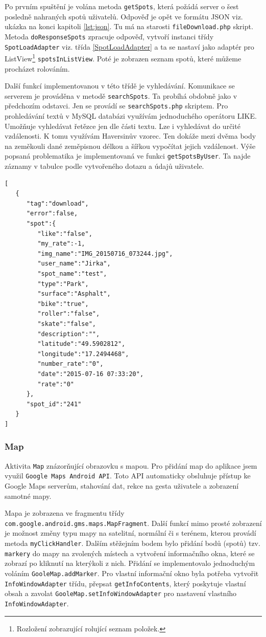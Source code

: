 \documentclass[12pt]{article}
\begin{document}
Po prvním spuštění je volána metoda \verb+getSpots+, která požádá server o šest posledně nahraných spotů uživatelů. Odpověď je opět ve formátu JSON viz. ukázka na konci kapitoli \ref{lst:json}. Tu má na starosti \verb+fileDownload.php+ skript. Metoda \verb+doResponseSpots+ zpracuje odpověď, vytvoří instanci třídy \verb+SpotLoadAdapter+ viz. třída \ref{SpotLoadAdapter} a ta se nastaví jako adaptér pro ListView\footnote[11]{Rozložení zobrazující rolující seznam položek.} \verb+spotsInListView+. Poté je zobrazen seznam spotů, které můžeme procházet rolováním.

Další funkcí implementovanou v této třídě je vyhledávání. Komunikace se serverem je prováděna v metodě \verb+searchSpots+. Ta probíhá obdobně jako v předchozím odstavci. Jen se provádí se \verb+searchSpots.php+ skriptem. Pro prohledávání textů v MySQL databázi využívám jednoduchého operátoru LIKE. Umožňuje vyhledávat řetězce jen dle části textu. Lze i vyhledávat do určité vzdálenosti. K tomu využívám Haversinův vzorec. Ten dokáže mezi dvěma body na zeměkouli dané zeměpisnou délkou a šířkou vypočítat jejich vzdálenost.\cite{haversine} Výše popsaná problematika je implementovaná ve funkci \verb+getSpotsByUser+. Ta najde záznamy v tabulce podle vytvořeného dotazu a údajů uživatele.
\newpage
\begin{lstlisting}[title=Ukázka odpovědi PHP skriptu fileDownload.php,
label={lst:json}]
[
   {
      "tag":"download",
      "error":false,
      "spot":{
         "like":"false",
         "my_rate":-1,
         "img_name":"IMG_20150716_073244.jpg",
         "user_name":"Jirka",
         "spot_name":"test",
         "type":"Park",
         "surface":"Asphalt",
         "bike":"true",
         "roller":"false",
         "skate":"false",
         "description":"",
         "latitude":"49.5902812",
         "longitude":"17.2494468",
         "number_rate":"0",
         "date":"2015-07-16 07:33:20",
         "rate":"0"
      },
      "spot_id":"241"
   }
]
\end{lstlisting}
\subsubsection{Map}
\label{map}
Aktivita \verb+Map+ znázorňující obrazovku s mapou. Pro přidání map do aplikace jsem využil \verb+Google Maps Android API+. Toto API automaticky obsluhuje přístup ke Google Maps serverům, stahování dat, rekce na gesta uživatele a zobrazení samotné mapy.\cite{maps}

Mapa je zobrazena ve fragmentu třídy \verb+com.google.android.gms.maps.MapFragment+. Další funkcí mimo prosté zobrazení je možnost změny typu mapy na satelitní, normální či s terénem, kterou provádí metoda \verb+myClickHandler+. Dalším stěžejním bodem bylo přidání bodů (spotů) tzv. \verb+markery+ do mapy na zvolených místech a vytvoření informačního okna, které se zobrazí po kliknutí na kterýkoli z nich.
Přidání se implementovalo jednoduchým voláním \verb+GooleMap.addMarker+. Pro vlastní informační okno byla potřeba vytvořit \verb+InfoWindowAdapter+ třídu, přepsat \verb+getInfoContents+, který poskytuje vlastní obsah a zavolat \verb+GooleMap.setInfoWindowAdapter+ pro nastavení vlastního \verb+InfoWindowAdapter+.
\end{document}
